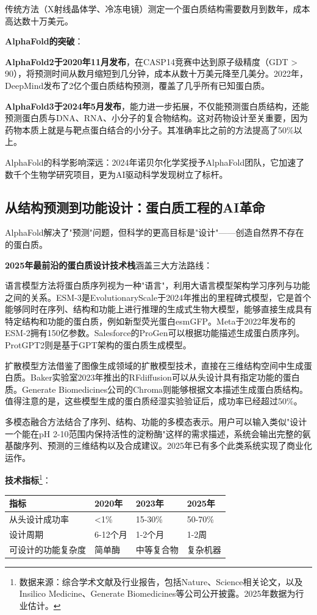 传统方法（X射线晶体学、冷冻电镜）测定一个蛋白质结构需要数月到数年，成本高达数十万美元。

\textbf{AlphaFold的突破}：

\textbf{AlphaFold2于2020年11月发布}\cite{jumper2021highly}，在CASP14竞赛中达到原子级精度（GDT > 90），将预测时间从数月缩短到几分钟，成本从数十万美元降至几美分。2022年，DeepMind发布了2亿个蛋白质结构预测，覆盖了几乎所有已知蛋白质。

\textbf{AlphaFold3于2024年5月发布}，能力进一步拓展，不仅能预测蛋白质结构，还能预测蛋白质与DNA、RNA、小分子的复合物结构。这对药物设计至关重要，因为药物本质上就是与靶点蛋白结合的小分子。其准确率比之前的方法提高了50\%以上。

AlphaFold的科学影响深远：2024年诺贝尔化学奖授予AlphaFold团队，它加速了数千个生物学研究项目，更为AI驱动科学发现树立了标杆。

\subsection{从结构预测到功能设计：蛋白质工程的AI革命}

AlphaFold解决了"预测"问题，但科学的更高目标是"设计"——创造自然界不存在的蛋白质。

\textbf{2025年最前沿的蛋白质设计技术栈}涵盖三大方法路线：

语言模型方法将蛋白质序列视为一种"语言"，利用大语言模型架构学习序列与功能之间的关系。ESM-3是EvolutionaryScale于2024年推出的里程碑式模型，它是首个能够同时在序列、结构和功能上进行推理的生成式生物大模型，能够直接生成具有特定结构和功能的蛋白质，例如新型荧光蛋白esmGFP。Meta于2022年发布的ESM-2拥有150亿参数。Salesforce的ProGen可以根据功能描述生成蛋白质序列。ProtGPT2则是基于GPT架构的蛋白质生成模型。

扩散模型方法借鉴了图像生成领域的扩散模型技术，直接在三维结构空间中生成蛋白质。Baker实验室2023年推出的RFdiffusion可以从头设计具有指定功能的蛋白质。Generate Biomedicines公司的Chroma则能够根据文本描述生成蛋白质结构。值得注意的是，这些模型生成的蛋白质经湿实验验证后，成功率已经超过50\%。

多模态融合方法结合了序列、结构、功能的多模态表示。用户可以输入类似"设计一个能在pH 2-10范围内保持活性的淀粉酶"这样的需求描述，系统会输出完整的氨基酸序列、预测的三维结构以及合成建议。2025年已有多个此类系统实现了商业化运作。

\textbf{技术指标}\footnote{数据来源：综合学术文献及行业报告，包括Nature、Science相关论文，以及Insilico Medicine、Generate Biomedicines等公司公开披露。2025年数据为行业估计。}：
\begin{table}[H]
\centering
\small
\begin{tabular}{p{3.8cm}p{2.8cm}p{2.8cm}p{2.8cm}}
\toprule
\textbf{指标} & \textbf{2020年} & \textbf{2023年} & \textbf{2025年} \\
\midrule
从头设计成功率 & <1\% & 15-30\% & 50-70\% \\
设计周期 & 6-12个月 & 1-2个月 & 1-2周 \\
可设计的功能复杂度 & 简单酶 & 中等复合物 & 复杂机器 \\
\bottomrule
\end{tabular}
\end{table}

